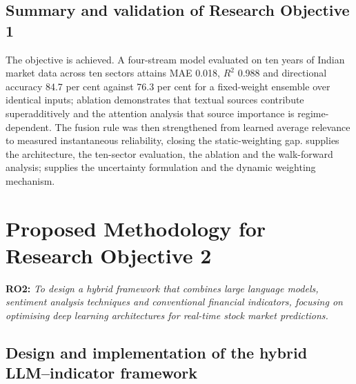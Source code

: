\subsection{Summary and validation of Research Objective 1}

The objective is achieved. A four-stream model evaluated on ten years of Indian market data
across ten sectors attains MAE 0.018, $R^2$ 0.988 and directional accuracy 84.7 per cent
against 76.3 per cent for a fixed-weight ensemble over identical inputs; ablation demonstrates
that textual sources contribute superadditively and the attention analysis that source
importance is regime-dependent. The fusion rule was then strengthened from learned average
relevance to measured instantaneous reliability, closing the static-weighting gap.
 supplies the architecture, the ten-sector evaluation, the ablation and the
walk-forward analysis;  supplies the uncertainty formulation and the dynamic
weighting mechanism.

\section{Proposed Methodology for Research Objective 2}

\textbf{RO2:} \emph{To design a hybrid framework that combines large language models,
sentiment analysis techniques and conventional financial indicators, focusing on optimising
deep learning architectures for real-time stock market predictions.}

\subsection{Design and implementation of the hybrid LLM--indicator framework}

